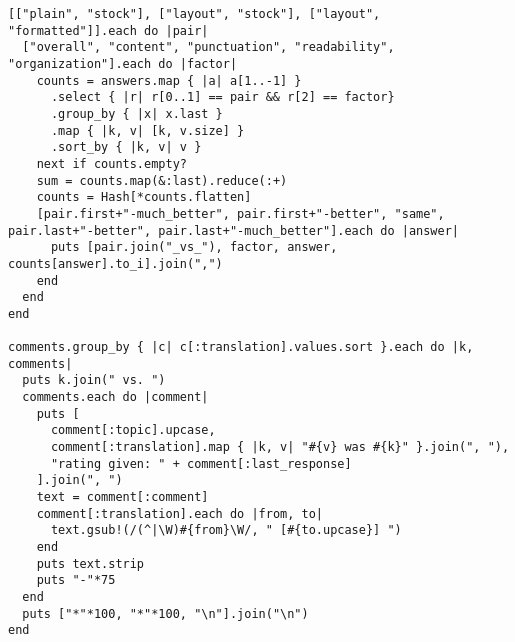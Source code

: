 \documentclass{article}
\begin{document}
\begin{verbatim}
[["plain", "stock"], ["layout", "stock"], ["layout", "formatted"]].each do |pair|
  ["overall", "content", "punctuation", "readability", "organization"].each do |factor|
    counts = answers.map { |a| a[1..-1] }
      .select { |r| r[0..1] == pair && r[2] == factor}
      .group_by { |x| x.last }
      .map { |k, v| [k, v.size] }
      .sort_by { |k, v| v }
    next if counts.empty?
    sum = counts.map(&:last).reduce(:+)
    counts = Hash[*counts.flatten]
    [pair.first+"-much_better", pair.first+"-better", "same", pair.last+"-better", pair.last+"-much_better"].each do |answer|
      puts [pair.join("_vs_"), factor, answer, counts[answer].to_i].join(",")
    end
  end
end

comments.group_by { |c| c[:translation].values.sort }.each do |k, comments|
  puts k.join(" vs. ")
  comments.each do |comment|
    puts [
      comment[:topic].upcase,
      comment[:translation].map { |k, v| "#{v} was #{k}" }.join(", "),
      "rating given: " + comment[:last_response]
    ].join(", ")
    text = comment[:comment]
    comment[:translation].each do |from, to|
      text.gsub!(/(^|\W)#{from}\W/, " [#{to.upcase}] ")
    end
    puts text.strip
    puts "-"*75
  end
  puts ["*"*100, "*"*100, "\n"].join("\n")
end


\end{verbatim}
\pagebreak
\end{document}
